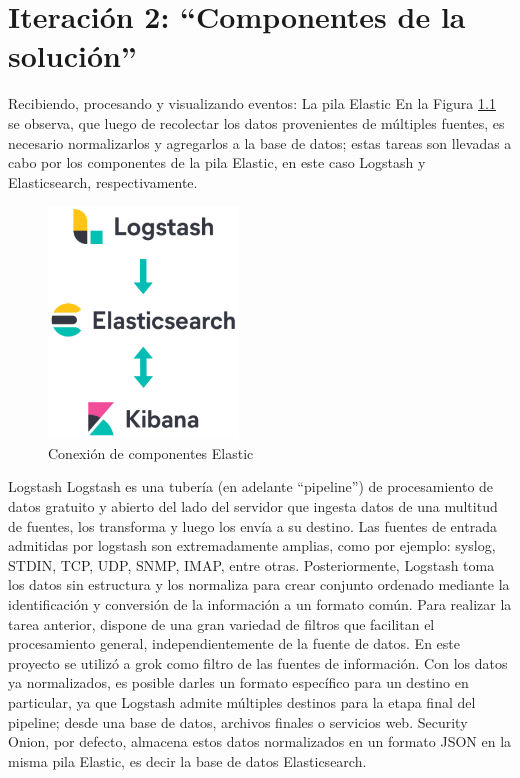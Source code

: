 \chapter{Iteración 2: “Componentes de la solución”}
\begin{section}{Recibiendo, procesando y visualizando eventos: La pila Elastic}
   En la Figura \ref{fig:figura_20_conexion_comp_elastic} se observa, que luego de recolectar los datos provenientes de múltiples fuentes, es necesario normalizarlos y agregarlos a la base de datos; estas tareas son llevadas a cabo por los componentes de la pila Elastic, en este caso Logstash y Elasticsearch, respectivamente. 

   \begin{figure}[H]
        \centering
        \includegraphics[width=0.45\textwidth]{./iteracion_1_imagenes/figura_20_conexion_comp_elastic.png}
        \caption{Conexión de componentes Elastic}
        \label{fig:figura_20_conexion_comp_elastic}
    \end{figure}
        
   \end{section}
   \pagebreak
   \begin{subsection}{Logstash}
        Logstash es una tubería (en adelante “pipeline”) de procesamiento de datos gratuito y abierto del lado del servidor que ingesta datos de una multitud de fuentes, los transforma y luego los envía a su destino. Las fuentes de entrada admitidas por logstash son extremadamente amplias, como por ejemplo: syslog, STDIN, TCP, UDP, SNMP, IMAP, entre otras. Posteriormente, Logstash toma los datos sin estructura y los normaliza para crear conjunto ordenado mediante la identificación y conversión de la información a un formato común. Para realizar la tarea anterior, dispone de una gran variedad de filtros que facilitan el procesamiento general, independientemente de la fuente de datos. En este proyecto se utilizó a grok \cite{grok} como filtro de las fuentes de información. Con los datos ya normalizados, es posible darles un formato específico para un destino en particular, ya que Logstash admite múltiples destinos para la etapa final del pipeline; desde una base de datos, archivos finales o servicios web. Security Onion, por defecto, almacena estos datos normalizados en un formato JSON en la misma pila Elastic, es decir la base de datos Elasticsearch.
   \end{subsection}
   
